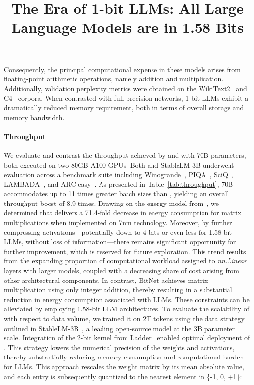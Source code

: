 \title{The Era of 1-bit LLMs: All Large Language Models are in 1.58 Bits}
Consequently, the principal computational expense in these models arises from floating-point arithmetic operations, namely addition and multiplication. Additionally, validation perplexity metrics were obtained on the WikiText2~\cite{wikitext2} and C4~\cite{c4} corpora. When contrasted with full-precision networks, 1-bit LLMs exhibit a dramatically reduced memory requirement, both in terms of overall storage and memory bandwidth. \paragraph{Throughput}

We evaluate and contrast the throughput achieved by  and  with 70B parameters, both executed on two 80GB A100 GPUs. Both  and StableLM-3B underwent evaluation across a benchmark suite including Winogrande~\cite{winoGrande}, PIQA~\cite{piqa}, SciQ~\cite{sciq}, LAMBADA~\cite{lambada}, and ARC-easy~\cite{arc}. As presented in Table~\ref{tab:throughput},  70B accommodates up to 11 times greater batch sizes than , yielding an overall throughput boost of 8.9 times. Drawing on the energy model from~\cite{energycost, pokebnn}, we determined that  delivers a 71.4-fold decrease in energy consumption for matrix multiplications when implemented on 7nm technology. Moreover, by further compressing activations—potentially down to 4 bits or even less for 1.58-bit LLMs, without loss of information—there remains significant opportunity for further improvement, which is reserved for future exploration. This trend results from the expanding proportion of computational workload assigned to \emph{nn.Linear} layers with larger models, coupled with a decreasing share of cost arising from other architectural components. In contrast, BitNet achieves matrix multiplication using only integer addition, thereby resulting in a substantial reduction in energy consumption associated with LLMs. These constraints can be alleviated by employing 1.58-bit LLM architectures. To evaluate the scalability of  with respect to data volume, we trained it on 2T tokens using the data strategy outlined in StableLM-3B~\cite{StableLM-3B-4E1T}, a leading open-source model at the 3B parameter scale. Integration of the 2-bit kernel from Ladder~\cite{ladder} enabled optimal deployment of . This strategy lowers the numerical precision of the weights and activations, thereby substantially reducing memory consumption and computational burden for LLMs. This approach rescales the weight matrix by its mean absolute value, and each entry is subsequently quantized to the nearest element in \{-1, 0, +1\}:

